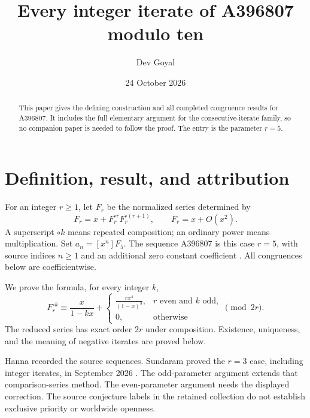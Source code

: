 \documentclass[11pt,a4paper]{article}
\title{Every integer iterate of A396807 modulo ten}
\author{Dev Goyal}
\date{24 October 2026}
\theoremstyle{remark}\newtheorem{remark}[theorem]{Remark}
\begin{document}
\maketitle
\begin{center}\end{center}

\begin{abstract}
This paper gives the defining construction and all completed congruence
results for A396807. It includes the full elementary argument for the
consecutive-iterate family, so no companion paper is needed to follow the
proof. The entry is the parameter $r=5$.
\end{abstract}
\section{Definition, result, and attribution}
For an integer $r\ge1$, let $F_r$ be the normalized series determined by
\begin{equation}\label{eq:family}
 F_r=x+F_r^{\circ r}F_r^{\circ(r+1)},\qquad F_r=x+O(x^2).
\end{equation}
A superscript $\circ k$ means repeated composition; an ordinary power
means multiplication. Set $a_n=[x^n]F_{5}$.
The sequence A396807 is this case $r=5$, with source
indices $n\ge1$ and an additional zero constant coefficient \cite{oeis}.
All congruences below are coefficientwise.

We prove the formula, for every integer $k$,
\[
F_r^{\circ k}\equiv
\frac{x}{1-kx}+
\begin{cases}
\displaystyle\frac{rx^4}{(1-x)^3},&r\text{ even and }k\text{ odd},\\[5pt]
0,&\text{otherwise}
\end{cases}
\pmod{2r}.
\]
The reduced series has exact order $2r$ under composition. Existence,
uniqueness, and the meaning of negative iterates are proved below.

Hanna recorded the source sequences. Sundaram proved the $r=3$ case,
including integer iterates, in September 2026 \cite{sundaram}. The
odd-parameter argument extends that comparison-series method.
The even-parameter argument needs the displayed correction. The source
conjecture labels in the retained collection do not establish exclusive
priority or worldwide openness.
\end{document}
